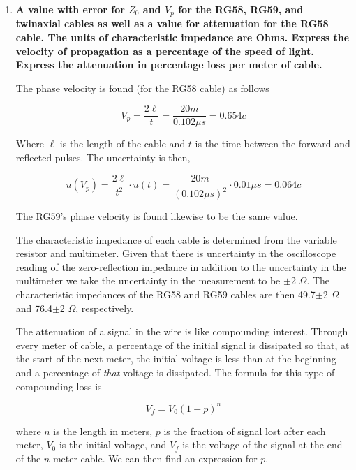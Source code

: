 \begin{enumerate}
\item {\bf A value with error for $Z_0$ and $V_p$ for the RG58, RG59, and twinaxial cables as well as a value for attenuation for the RG58 cable. The units of characteristic impedance are Ohms. Express the velocity of propagation as a percentage of the speed of light. Express the attenuation in percentage loss per meter of cable.}\newline

The phase velocity is found (for the RG58 cable) as follows

\begin{equation}
V_p=\dfrac{2\ell}{t}=\dfrac{20m}{0.102\mu s}=0.654c
\label{}
\end{equation}

\noindent Where $\ell$ is the length of the cable and $t$ is the time between the forward and reflected pulses. The uncertainty is then,

\begin{equation}
u(V_p)=\dfrac{2\ell}{t^2}\cdot u(t)=\dfrac{20m}{(0.102\mu s)^2}\cdot 0.01\mu s=0.064c
\label{}
\end{equation}

\noindent The RG59's phase velocity is found likewise to be the same value.

The characteristic impedance of each cable is determined from the variable resistor and multimeter. Given that there is uncertainty in the oscilloscope reading of the zero-reflection impedance in addition to the uncertainty in the multimeter we take the uncertainty in the measurement to be $\pm$2 $\Omega$. The characteristic impedances of the RG58 and RG59 cables are then 49.7$\pm$2 $\Omega$ and 76.4$\pm$2 $\Omega$, respectively.

The attenuation of a signal in the wire is like compounding interest. Through every meter of cable, a percentage of the initial signal is dissipated so that, at the start of the next meter, the initial voltage is less than at the beginning and a percentage of {\it that} voltage is dissipated. The formula for this type of compounding loss is

\begin{equation}
V_f=V_0(1-p)^n
\label{}
\end{equation}

\noindent where $n$ is the length in meters, $p$ is the fraction of signal lost after each meter, $V_0$ is the initial voltage, and $V_f$ is the voltage of the signal at the end of the $n$-meter cable. We can then find an expression for $p$.


\end{enumerate}
